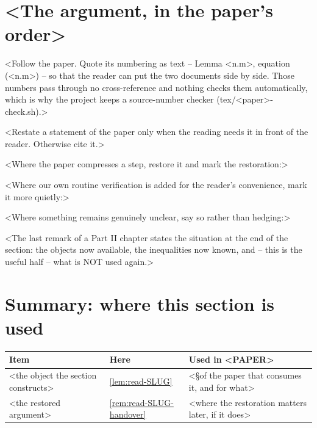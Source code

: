 \section{<The argument, in the paper's order>}
\label{sec:read-SLUG-argument}

<Follow the paper.  Quote its numbering as text -- Lemma <n.m>, equation
(<n.m>) -- so that the reader can put the two documents side by side.  Those
numbers pass through no cross-reference and nothing checks them
automatically, which is why
the project keeps a source-number checker (tex/<paper>-check.sh).>

\begin{lem}
\label{lem:read-SLUG}
<Restate a statement of the paper only when the reading needs it in front of
the reader.  Otherwise cite it.>
\end{lem}

<Where the paper compresses a step, restore it and mark the restoration:>

<Where our own routine verification is added for the reader's convenience,
mark it more quietly:>

<Where something remains genuinely unclear, say so rather than hedging:>

\begin{rem}
\label{rem:read-SLUG-handover}
<The last remark of a Part II chapter states the situation at the end of the
section: the objects now available, the inequalities now known, and -- this is
the useful half -- what is NOT used again.>
\end{rem}

\section{Summary: where this section is used}
\label{sec:read-SLUG-summary}

\begin{center}
\small
\begin{tabular}{@{}L{4.6cm}lL{5.9cm}@{}}
\toprule
Item & Here & Used in <PAPER> \\
\midrule
<the object the section constructs>
  & \ref{lem:read-SLUG}
  & <\S of the paper that consumes it, and for what> \\
<the restored argument>
  & \ref{rem:read-SLUG-handover}
  & <where the restoration matters later, if it does> \\
\bottomrule
\end{tabular}
\end{center}
